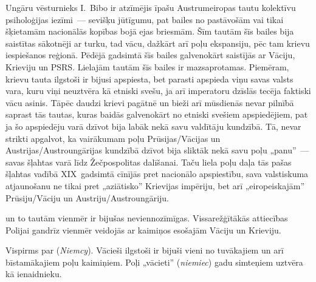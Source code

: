 \documentclass[twoside,a5paper,12pt,fleqn,openany]{extbook}
\newcommand{\pltxti}[1]{\textit{\textpolish{#1}}}
\begin{document}
Ungāru vēsturnieks I.~Bibo ir atzīmējis īpašu Austrumeiropas tautu kolektīvu psiholoģijas iezīmi~--- sevišķu jūtīgumu, pat bailes no pastāvošām vai tikai šķietamām nacionālās kopības bojā ejas briesmām. Šīm tautām šīs bailes bija saistītas sākotnēji ar turku, tad vācu, dažkārt arī poļu ekspansiju, pēc tam krievu iespiešanos reģionā. Pēdējā gadsimtā šīs bailes galvenokārt saistījās ar Vāciju, Krieviju un PSRS. Lielajām tautām šīs bailes ir mazsaprotamas. Piemēram, krievu tauta ilgstoši ir bijusi apspiesta, bet parasti apspieda viņu savas valsts vara, kuru viņi neuztvēra kā etniski svešu, ja arī imperatoru dzīslās tecēja faktiski vācu asinis. Tāpēc daudzi krievi pagātnē un bieži arī mūsdienās nevar pilnībā saprast tās tautas, kuras baidās galvenokārt no etniski svešiem apspiedējiem, pat ja šo apspiedēju varā dzīvot bija labāk nekā savu valdītāju kundzībā. Tā, nevar strikti apgalvot, ka vairākumam poļu Prūsijas/Vācijas un Austrijas/Austroungārijas kundzībā dzīvot bija sliktāk nekā savu poļu „panu”~--- savas šļahtas varā līdz Žečpospolitas dalīšanai. Taču liela poļu daļa tās pašas šļahtas vadībā XIX~gadsimtā cīnījās pret nacionālo apspiestību, sava valstiskuma atjaunošanu ne tikai pret „aziātisko” Krievijas impēriju, bet arī „eiropeiskajām” Prūsiju/Vāciju un Austriju/Austroungāriju.

 un to tautām vienmēr ir bijušas neviennozīmīgas. Vissarežģītākās attiecības Polijai gandrīz vienmēr veidojās ar kaimiņos esošajām Vāciju un Krieviju.

Vispirms par  (\pltxti{Niemcy}). Vācieši ilgstoši ir bijuši vieni no tuvākajiem un arī bīstamākajiem poļu kaimiņiem. Poļi „vācieti” (\pltxti{niemiec}) gadu simteņiem uztvēra kā ienaidnieku.
\end{document}
